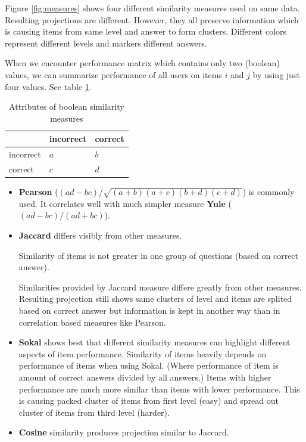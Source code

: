 \documentclass[
  digital, %
  table,   %
  nolof,     %
  nolot,     %
  nocover
]{fithesis3}
\begin{document}

Figure \ref{fig:measures} shows four different similarity measures used on same data. Resulting projections are different. However, they all preserve information which is causing items from same level and answer to form clusters. Different colors represent different levels and markers different answers.


When we encounter performance matrix which contains only two (boolean) values, we can summarize performance of all users on items $i$ and $j$ by using just four values. See table \ref{tab:boolean-attributes}.

\begin{table}
  \begin{tabular}{ l | l | l | }
  \hline
  	 & incorrect & correct \\ \hline
  	incorrect & $a$ & $b$ \\ \hline
  	correct & $c$ & $d$ \\ \hline
  \end{tabular}
  \caption{Attributes of boolean similarity measures}
  \label{tab:boolean-attributes}
\end{table}

\begin{itemize}
\item
  \textbf{Pearson} ($(ad - bc) / \sqrt{(a+b)(a+c)(b+d)(c+d)}$) is commonly used. It correlates well with much simpler measure \textbf{Yule} ($(ad-bc)/(ad+bc)$).

\item
  \textbf{Jaccard} differs visibly from other measures.

  Similarity of items is not greater in one group of questions (based on correct answer).

  Similarities provided by Jaccard measure differe greatly from other
  measures. Resulting projection still shows same clusters of level and
  items are splited based on correct answer but information is kept in
  another way than in correlation based measures like Pearson.

\item
  \textbf{Sokal} shows best that different similarity measures can highlight different aspects of item performance. Similarity of items  heavily depends on performance of items when using Sokal. (Where performance of item is amount of correct answers divided by all answers.) Items with higher performance are much more similar than items with lower performance. This is causing packed cluster of items from first level (easy) and spread out cluster of items from third level (harder).

\item
  \textbf{Cosine} similarity produces projection similar to Jaccard.
\end{itemize}
\end{document}
